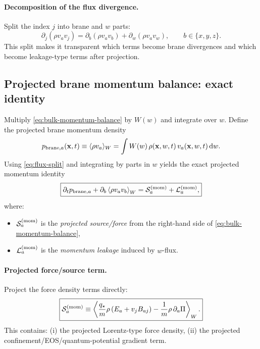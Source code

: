 \documentclass[11pt]{article}
\newcommand{\qstar}{q_\star}
\begin{document}
\paragraph{Decomposition of the flux divergence.}
Split the index $j$ into brane and $w$ parts:
\begin{equation}
\partial_j(\rho v_a v_j)
=
\partial_b(\rho v_a v_b) + \partial_w(\rho v_a v_w),
\qquad b\in\{x,y,z\}.
\label{eq:flux-split}
\end{equation}
This split makes it transparent which terms become brane divergences and which become leakage-type terms after projection.

\subsection{Projected brane momentum balance: exact identity}
\label{app:momentum-projected}

Multiply \eqref{eq:bulk-momentum-balance} by $W(w)$ and integrate over $w$. Define the projected brane momentum density
\begin{equation}
p_{{\rm brane},a}(\mathbf{x},t)\equiv \langle \rho v_a\rangle_W = \int W(w)\,\rho(\mathbf{x},w,t)\,v_a(\mathbf{x},w,t)\,\dd w.
\label{eq:pbrane-def}
\end{equation}
Using \eqref{eq:flux-split} and integrating by parts in $w$ yields the exact projected momentum identity
\begin{equation}
\boxed{
\partial_t p_{{\rm brane},a}
+
\partial_b \left\langle \rho v_a v_b \right\rangle_W
=
\mathcal{S}^{({\rm mom})}_a
+
\mathcal{L}^{({\rm mom})}_a,
}
\label{eq:proj-momentum-raw}
\end{equation}
where:
\begin{itemize}[leftmargin=2.0em]
\item $\mathcal{S}^{({\rm mom})}_a$ is the \emph{projected source/force} from the right-hand side of \eqref{eq:bulk-momentum-balance},
\item $\mathcal{L}^{({\rm mom})}_a$ is the \emph{momentum leakage} induced by $w$-flux.
\end{itemize}

\paragraph{Projected force/source term.}
Project the force density terms directly:
\begin{equation}
\boxed{
\mathcal{S}^{({\rm mom})}_a
\equiv
\left\langle
\frac{\qstar}{m}\rho\,(E_a+v_j B_{aj})
-\frac{1}{m}\rho\,\partial_a\Pi
\right\rangle_W.
}
\label{eq:proj-mom-source}
\end{equation}
This contains: (i) the projected Lorentz-type force density, (ii) the projected confinement/EOS/quantum-potential gradient term.
\end{document}
